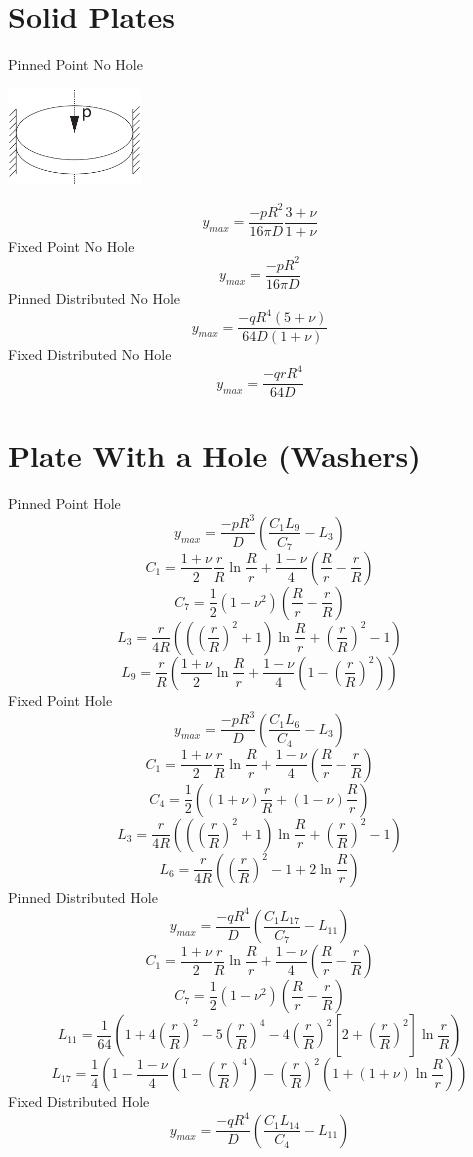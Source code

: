 \documentclass[10pt,letterpaper]{report}
\numberwithin{equation}{chapter}
\begin{document}
\section{Solid Plates}
Pinned Point No Hole

\includegraphics[width=100pt]{3D_fixed_point_NoHole.pdf}

\[y_{max} = \frac{-p R^2}{16 \pi D} \frac{3 + \nu}{1 + \nu}\]
Fixed Point No Hole
\[y_{max} = \frac{-p R^2}{16 \pi D}\]
Pinned Distributed No Hole
\[y_{max} = \frac{-q R^4 (5+ \nu)}{64D(1+\nu)}\]
Fixed Distributed No Hole
\[y_{max} = \frac{-q rR^4}{64D}\]

\section{Plate With a Hole (Washers)}
Pinned Point Hole
\[y_{max}=\frac{-p R^3}{D}\left(\frac{C_1 L_9}{C_7} - L_3\right)\]
\[C_1 = \frac{1+\nu}{2}\frac{r}{R} \ln \frac{R}{r}+\frac{1-\nu}{4} \left( \frac{R}{r} - \frac{r}{R}\right)\]
\[C_7 = \frac{1}{2} (1-\nu^2)\left( \frac{R}{r} - \frac{r}{R}\right)\]
\[L_3 = \frac{r}{4R}\left( \left(\left( \frac{r}{R} \right) ^2 +1 \right) \ln \frac{R}{r} + \left( \frac{r}{R}\right)^2 -1 \right)\]
\[L_9 = \frac{r}{R}\left( \frac{1+\nu}{2} \ln \frac{R}{r}    + \frac{1-\nu}{4}  \left( 1 - \left( \frac{r}{R} \right) ^2  \right) \right)\]
Fixed Point Hole
\[y_{max}=\frac{-p R^3}{D}\left(\frac{C_1 L_6}{C_4} - L_3\right)\]
\[C_1 = \frac{1+\nu}{2}\frac{r}{R} \ln \frac{R}{r}+\frac{1-\nu}{4} \left( \frac{R}{r} - \frac{r}{R}\right)\]
\[C_4 = \frac{1}{2} \left( (1+\nu)\frac{r}{R} + (1-\nu) \frac{R}{r} \right)\]
\[L_3 = \frac{r}{4R}\left( \left(\left( \frac{r}{R} \right) ^2 +1 \right) \ln \frac{R}{r} + \left( \frac{r}{R}\right)^2 -1 \right)\]
\[L_6 = \frac{r}{4R}\left( \left( \frac{r}{R} \right) ^2 -1+2 \ln \frac{R}{r}  \right)\]
Pinned Distributed Hole
\[y_{max}=\frac{-q R^4}{D}\left(\frac{C_1 L_{17}}{C_7} - L_{11}\right)\]
\[C_1 = \frac{1+\nu}{2}\frac{r}{R} \ln \frac{R}{r}+\frac{1-\nu}{4} \left( \frac{R}{r} - \frac{r}{R}\right)\]
\[C_7 = \frac{1}{2} (1-\nu^2)\left( \frac{R}{r} - \frac{r}{R}\right)\]
\[L_{11} = \frac{1}{64} \left(1 + 4 \left( \frac{r}{R}\right)^2 -5\left( \frac{r}{R}\right)^4 -4\left( \frac{r}{R}\right)^2\left[ 2 + \left( \frac{r}{R}\right)^2 \right] \ln  \frac{r}{R} \right) \]
\[L_{17} =\frac{1}{4} \left( 1 - \frac{1-\nu}{4} \left( 1 - \left( \frac{r}{R} \right) ^4 \right) - \left( \frac{r}{R} \right) ^2 \left( 1 + (1 + \nu ) \ln \frac{R}{r} \right) \right) \]
Fixed Distributed Hole
\[y_{max}=\frac{-q R^4}{D}\left(\frac{C_1 L_{14}}{C_4} - L_{11}\right)\]
\end{document}
